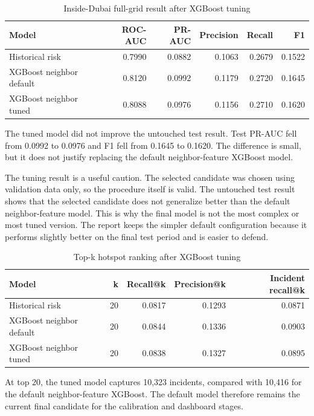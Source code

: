 \begin{table}[H]
\centering
\caption{Inside-Dubai full-grid result after XGBoost tuning}
\label{tab:xgboost_tuning_test_metrics}
\small
\begin{tabular}{lrrrrr}
\toprule
\textbf{Model} & \textbf{ROC-AUC} & \textbf{PR-AUC} & \textbf{Precision} & \textbf{Recall} & \textbf{F1} \\
\midrule
Historical risk & 0.7990 & 0.0882 & 0.1063 & 0.2679 & 0.1522 \\
XGBoost neighbor default & 0.8120 & 0.0992 & 0.1179 & 0.2720 & 0.1645 \\
XGBoost neighbor tuned & 0.8088 & 0.0976 & 0.1156 & 0.2710 & 0.1620 \\
\bottomrule
\end{tabular}
\end{table}

The tuned model did not improve the untouched test result. Test PR-AUC fell from 0.0992 to 0.0976 and F1 fell from 0.1645 to 0.1620. The difference is small, but it does not justify replacing the default neighbor-feature XGBoost model.

The tuning result is a useful caution. The selected candidate was chosen using validation data only, so the procedure itself is valid. The untouched test result shows that the selected candidate does not generalize better than the default neighbor-feature model. This is why the final model is not the most complex or most tuned version. The report keeps the simpler default configuration because it performs slightly better on the final test period and is easier to defend.

\begin{table}[H]
\centering
\caption{Top-k hotspot ranking after XGBoost tuning}
\label{tab:xgboost_tuning_topk}
\small
\begin{tabular}{lrrrr}
\toprule
\textbf{Model} & \textbf{k} & \textbf{Recall@k} & \textbf{Precision@k} & \textbf{Incident recall@k} \\
\midrule
Historical risk & 20 & 0.0817 & 0.1293 & 0.0871 \\
XGBoost neighbor default & 20 & 0.0844 & 0.1336 & 0.0903 \\
XGBoost neighbor tuned & 20 & 0.0838 & 0.1327 & 0.0895 \\
\bottomrule
\end{tabular}
\end{table}

At top 20, the tuned model captures 10,323 incidents, compared with 10,416 for the default neighbor-feature XGBoost. The default model therefore remains the current final candidate for the calibration and dashboard stages.


